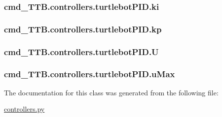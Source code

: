 \subsubsection[{\texorpdfstring{ki}{ki}}]{\setlength{\rightskip}{0pt plus 5cm}cmd\+\_\+\+T\+T\+B.\+controllers.\+turtlebot\+P\+I\+D.\+ki}\hypertarget{classcmd__TTB_1_1controllers_1_1turtlebotPID_aaf815b510701e946034699cf9039b961}{}\label{classcmd__TTB_1_1controllers_1_1turtlebotPID_aaf815b510701e946034699cf9039b961}
\subsubsection[{\texorpdfstring{kp}{kp}}]{\setlength{\rightskip}{0pt plus 5cm}cmd\+\_\+\+T\+T\+B.\+controllers.\+turtlebot\+P\+I\+D.\+kp}\hypertarget{classcmd__TTB_1_1controllers_1_1turtlebotPID_a46f9e76ece4ade360926bdc5250cdfc3}{}\label{classcmd__TTB_1_1controllers_1_1turtlebotPID_a46f9e76ece4ade360926bdc5250cdfc3}
\subsubsection[{\texorpdfstring{U}{U}}]{\setlength{\rightskip}{0pt plus 5cm}cmd\+\_\+\+T\+T\+B.\+controllers.\+turtlebot\+P\+I\+D.\+U}\hypertarget{classcmd__TTB_1_1controllers_1_1turtlebotPID_abc36f71fca7350bacae66d199d9cc18f}{}\label{classcmd__TTB_1_1controllers_1_1turtlebotPID_abc36f71fca7350bacae66d199d9cc18f}
\subsubsection[{\texorpdfstring{u\+Max}{uMax}}]{\setlength{\rightskip}{0pt plus 5cm}cmd\+\_\+\+T\+T\+B.\+controllers.\+turtlebot\+P\+I\+D.\+u\+Max}\hypertarget{classcmd__TTB_1_1controllers_1_1turtlebotPID_a9eedbb29702ca64a002d8b13a79f515b}{}\label{classcmd__TTB_1_1controllers_1_1turtlebotPID_a9eedbb29702ca64a002d8b13a79f515b}


The documentation for this class was generated from the following file\+:\begin{DoxyCompactItemize}
\item 
\hyperlink{controllers_8py}{controllers.\+py}\end{DoxyCompactItemize}
